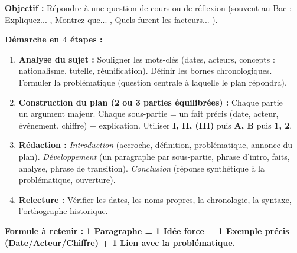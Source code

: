 \documentclass[11pt]{article}
\newcommand{\cle}[1]{{\popxbold\color{popdark}#1}}
\begin{document}
\begin{methode}
\textbf{Objectif :} Répondre à une question de cours ou de réflexion (souvent au Bac : \guillemotleft Expliquez... \guillemotright, \guillemotleft Montrez que... \guillemotright, \guillemotleft Quels furent les facteurs... \guillemotright).\par
\textbf{Démarche en 4 étapes :}
\begin{enumerate}
    \item \textbf{Analyse du sujet :} Souligner les mots-clés (dates, acteurs, concepts : \cle{nationalisme}, \cle{tutelle}, \cle{réunification}). Définir les bornes chronologiques. Formuler la \cle{problématique} (question centrale à laquelle le plan répondra).
    \item \textbf{Construction du plan (2 ou 3 parties équilibrées) :} Chaque partie = un argument majeur. Chaque sous-partie = un fait précis (date, acteur, événement, chiffre) + explication. Utiliser \textbf{I, II, (III)} puis \textbf{A, B} puis \textbf{1, 2}.
    \item \textbf{Rédaction :} \emph{Introduction} (accroche, définition, problématique, annonce du plan). \emph{Développement} (un paragraphe par sous-partie, phrase d'intro, faits, analyse, phrase de transition). \emph{Conclusion} (réponse synthétique à la problématique, ouverture).
    \item \textbf{Relecture :} Vérifier les dates, les noms propres, la chronologie, la syntaxe, l'orthographe historique.
\end{enumerate}
\textbf{Formule à retenir :} \textbf{1 Paragraphe = 1 Idée force + 1 Exemple précis (Date/Acteur/Chiffre) + 1 Lien avec la problématique.}
\end{methode}
\end{document}
